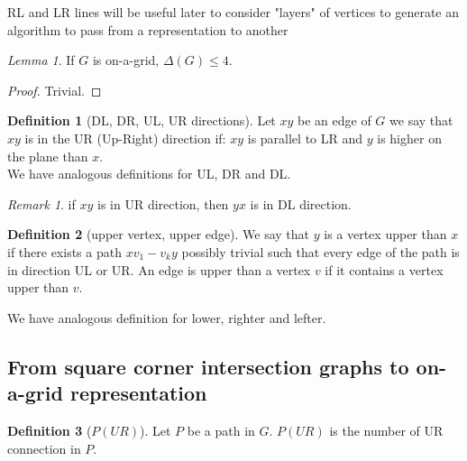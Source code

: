\documentclass[12pt]{article}
\theoremstyle{definition}
\newtheorem{definition}{Definition}[section]
\theoremstyle{remark}
\newtheorem*{remark}{Remark}
\newtheorem{lemma}[theorem]{Lemma}
\begin{document}
RL and LR lines will be useful later to consider "layers" of vertices to generate an algorithm to pass from a representation to another

\begin{lemma}
    If $G$ is on-a-grid, $\Delta(G) \le 4$.
\end{lemma}

\begin{proof}
    Trivial.
\end{proof}

\begin{definition}[DL, DR, UL, UR directions]
    Let $xy$ be an edge of $G$ we say that $xy$ is in the UR (Up-Right) direction if: $xy$ is parallel to LR and $y$ is higher on the plane than $x$.\\
    We have analogous definitions for UL, DR and  DL. 
\end{definition}

\begin{remark}
    if $xy$ is in UR direction, then $yx$ is in DL direction.
\end{remark}

\begin{definition}[upper vertex, upper edge]
    We say that $y$ is a vertex upper than $x$ if there exists a path $xv_1-v_ky$ possibly trivial such that every edge of the path is in direction UL or UR. 
    An edge is upper than a vertex $v$ if it contains a vertex upper than $v$.
\end{definition}

We have analogous definition for lower, righter and lefter.



\subsection{From square corner intersection graphs to on-a-grid representation }

\begin{definition}[$P(UR)$]
    Let $P$ be a path in $G$. $P(UR)$ is the number of UR connection in $P$.
\end{definition}
\end{document}
